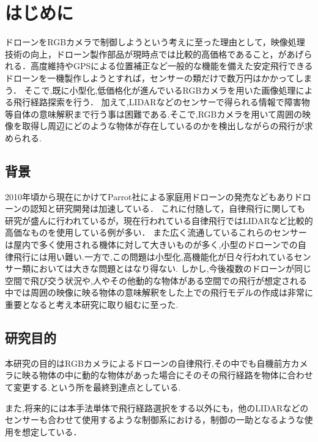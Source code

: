 \section{はじめに}
ドローンをRGBカメラで制御しようという考えに至った理由として，映像処理技術の向上，ドローン製作部品が現時点では比較的高価格であること，があげられる．高度維持やGPSによる位置補正など一般的な機能を備えた安定飛行できるドローンを一機製作しようとすれば，センサーの類だけで数万円はかかってしまう．
そこで,既に小型化,低価格化が進んでいるRGBカメラを用いた画像処理による飛行経路探索を行う．
加えて,LIDARなどのセンサーで得られる情報で障害物等自体の意味解釈まで行う事は困難である.そこで,RGBカメラを用いて周囲の映像を取得し周辺にどのような物体が存在しているのかを検出しながらの飛行が求められる.


\subsection{背景}
2010年頃から現在にかけてParrot社による家庭用ドローンの発売などもありドローンの認知と研究開発は加速している．
これに付随して，自律飛行に関しても研究が盛んに行われているが，現在行われている自律飛行ではLIDARなど比較的高価なものを使用している例が多い．
また広く流通しているこれらのセンサーは屋内で多く使用される機体に対して大きいものが多く,小型のドローンでの自律飛行には用い難い.一方で,この問題は小型化,高機能化が日々行われているセンサー類においては大きな問題とはなり得ない.
しかし,今後複数のドローンが同じ空間で飛び交う状況や,人やその他動的な物体がある空間での飛行が想定される中では周囲の映像に映る物体の意味解釈をした上での飛行モデルの作成は非常に重要となると考え本研究に取り組むに至った.


\subsection{研究目的}
本研究の目的はRGBカメラによるドローンの自律飛行,その中でも自機前方カメラに映る物体の中に動的な物体があった場合にそのその飛行経路を物体に合わせて変更する.という所を最終到達点としている.

また,将来的には本手法単体で飛行経路選択をする以外にも，他のLIDARなどのセンサーも合わせて使用するような制御系における，制御の一助となるような使用を想定している．

